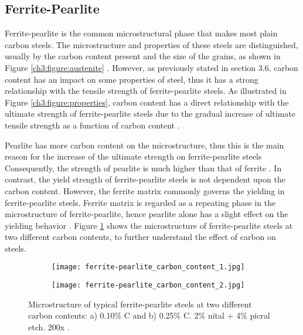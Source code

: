 \subsection{Ferrite-Pearlite}
Ferrite-pearlite is the common microstructural phase that makes most plain carbon steels. The microstructure and properties of these steels are distinguished, usually by the carbon content present and the size of the grains, as shown in Figure \ref{ch3:figure:austenite} \cite{molabe2018determining}. However, as previously stated in section 3.6, carbon content has an impact on some properties of steel, thus it has a strong relationship with the tensile strength of ferrite-pearlite steels. As illustrated in Figure \ref{ch3:figure:properties}, carbon content has a direct relationship with the ultimate strength of ferrite-pearlite steels due to the gradual increase of ultimate tensile strength as a function of carbon content \cite{cmrp2014maintenance}. 

Pearlite has more carbon content on the microstructure, thus this is the main reason for the increase of the ultimate strength on ferrite-pearlite steels \cite{bajaj2020steels} Consequently, the strength of pearlite is much higher than that of ferrite \cite{molabe2018determining}. In contrast, the yield strength of ferrite-pearlite steels is not dependent upon the carbon content. However, the ferrite matrix commonly governs the yielding in ferrite-pearlite steels. Ferrite matrix is regarded as a repeating phase in the microstructure of ferrite-pearlite, hence pearlite alone has a slight effect on the yielding behavior \cite{molabe2018determining}. Figure \ref{ch3:figure:contents} shows the microstructure of ferrite-pearlite steels at two different carbon contents, to further understand the effect of carbon on steels.

\begin{figure}[H]

\centering
\begin{subfigure}{.45\textwidth}
    \centering
    \texttt{[image: ferrite-pearlite\_carbon\_content\_1.jpg]}
    \caption{}
\end{subfigure}
\begin{subfigure}{.45\textwidth}
    \centering
    \texttt{[image: ferrite-pearlite\_carbon\_content\_2.jpg]}
    \caption{}
\end{subfigure}

\caption{Microstructure of typical ferrite-pearlite steels at two different carbon contents: a) 0.10\% C and b) 0.25\% C. 2\% nital + 4\% picral etch. 200x \cite{molabe2018determining}.}
\label{ch3:figure:contents}
\end{figure}
 
